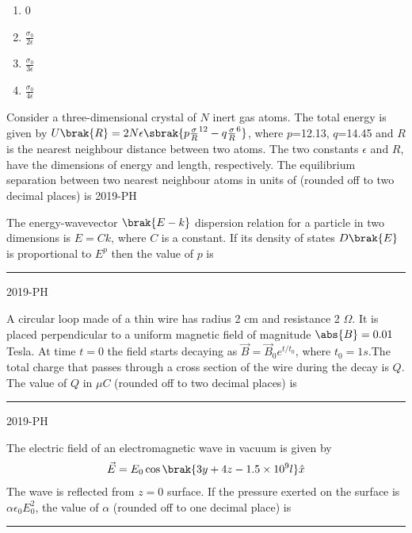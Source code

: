 	\begin{multicols}{4}
	\begin{enumerate}
		\item 0
		\item $\frac{\sigma_{0}}{2\epsilon}$
		\item $\frac{\sigma_{0}}{3\epsilon}$
		\item $\frac{\sigma_{0}}{4\epsilon}$
	\end{enumerate}
	\end{multicols}

\item Consider a three-dimensional crystal of $N$ inert gas atoms. The total energy is given by $U\brak{R}=2N \epsilon \sbrak{p\frac{\sigma}{R}^{12}-q\frac{\sigma}{R}^{6}}$, where $p$=12.13, $q$=14.45 and $R$ is the nearest neighbour distance between two atoms. The two constants $\epsilon$ and $R$, have the dimensions of energy and length, respectively. The equilibrium separation between two nearest neighbour atoms in units of (rounded off to two decimal places) is 
\hfill{2019-PH}


\item The energy-wavevector $\brak{E-k}$ dispersion relation for a particle in two dimensions is $E = Ck$, where $C$ is a constant. If its density of states $D\brak{E}$ is proportional to $E^p$ then the value of $p$ is \rule{1cm}{0.2pt}

\hfill{2019-PH}


\item  A circular loop made of a thin wire has radius 2 cm and resistance 2 $\Omega$. It is placed perpendicular to a uniform magnetic field of magnitude $\abs{B}=0.01$ Tesla. At time $t=0$ the field starts decaying as $\vec{B}=\vec{B}_{0} e^{t/t_{0}}$, where $t_{0}=1s$.The total charge that passes through a cross section of the wire during the decay is $Q$. The value of $Q$ in $\mu C$ (rounded off to two decimal places) is \rule{1cm}{0.2pt}

\hfill{2019-PH}

\item The electric field of an electromagnetic wave in vacuum is given by 
	\begin{align*}
	\vec{E}=E_{0} \cos \brak{3y+4z-1.5 \times 10^{9}l} \hat{x}
	\end{align*}
The wave is reflected from $z=0$ surface. If the pressure exerted on the surface is $\alpha \epsilon_{0} E_{0}^{2}$, the value of $\alpha$ (rounded off to one decimal place) is \rule{1cm}{0.2pt}

